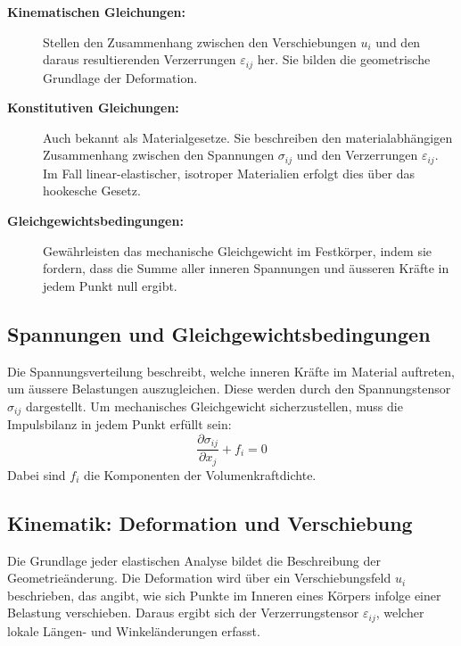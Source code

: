 \begin{description}
	\item [\textbf{Kinematischen Gleichungen:}] Stellen den Zusammenhang zwischen den Verschiebungen $u_i$ und den daraus resultierenden Verzerrungen $\varepsilon_{ij}$ her. 
	Sie bilden die geometrische Grundlage der Deformation.
	
	\item [\textbf{Konstitutiven Gleichungen:}] Auch bekannt als Materialgesetze. 
	Sie beschreiben den materialabhängigen Zusammenhang zwischen den Spannungen $\sigma_{ij}$ und den Verzerrungen $\varepsilon_{ij}$. 
	Im Fall linear-elastischer, isotroper Materialien erfolgt dies über das hookesche Gesetz.
	
	\item [\textbf{Gleichgewichtsbedingungen:}] Gewährleisten das mechanische Gleichgewicht im Festkörper, indem sie fordern, dass die Summe aller inneren Spannungen und äusseren Kräfte in jedem Punkt null ergibt.
\end{description}


\subsection{Spannungen und Gleichgewichtsbedingungen}

Die Spannungsverteilung beschreibt, welche inneren Kräfte im Material auftreten, um äussere Belastungen auszugleichen. Diese werden durch den Spannungstensor $\sigma_{ij}$ dargestellt. Um mechanisches Gleichgewicht sicherzustellen, muss die Impulsbilanz in jedem Punkt erfüllt sein:
\begin{equation}
	\frac{\partial \sigma_{ij}}{\partial x_j} + f_i = 0
\end{equation}
Dabei sind $f_i$ die Komponenten der Volumenkraftdichte.



\subsection{Kinematik: Deformation und Verschiebung}

Die Grundlage jeder elastischen Analyse bildet die Beschreibung der Geometrieänderung. Die Deformation wird über ein Verschiebungsfeld $u_i$ beschrieben, das angibt, wie sich Punkte im Inneren eines Körpers infolge einer Belastung verschieben. Daraus ergibt sich der Verzerrungstensor $\varepsilon_{ij}$, welcher lokale Längen- und Winkeländerungen erfasst.

